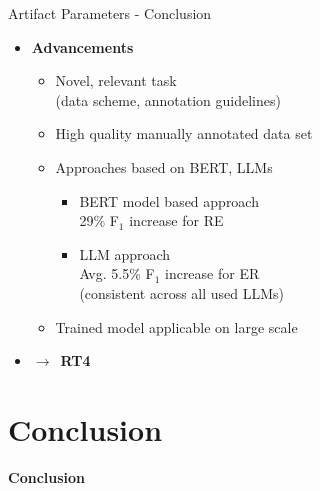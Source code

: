 \documentclass[en,16:9,smallfoot]{sdqbeamer}
\newcommand{\rtmark}[1]{%
    \textbf{{\color{objblue-box}\faCrosshairs}\,RT#1}%
}
\begin{document}
   \begin{frame}{Artifact Parameters - Conclusion}
    \begin{itemize}
        \item \textbf{Advancements}
        \begin{itemize}
            \item Novel, relevant task\\
                  (data scheme, annotation guidelines)
            \item High quality manually annotated data set
            \item Approaches based on BERT, LLMs
                \begin{itemize}
                \item BERT model based approach\\
                      29\% F${}_1$ increase for RE
                \item LLM approach\\
                      Avg. 5.5\% F${}_1$ increase for ER\\
                      (consistent across all used LLMs)
                \end{itemize}
            \item Trained model applicable on large scale
        \end{itemize}
        \item $\rightarrow$ \rtmark{4\large\checkmark}
    \end{itemize}
   \end{frame}

\section{Conclusion}

   \begin{frame}[plain]
        \vspace{0.7cm}
        \begin{infobox-map}
        \centering
        \begin{Huge}
        \textbf{Conclusion}\\
        \end{Huge}
        \end{infobox-map}
   \end{frame}
\end{document}
